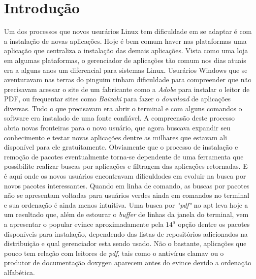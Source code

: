 \chapter{Introdução}
\label{cha:introducao}



Um dos processos  que novos usurários Linux tem dificuldade em se adaptar é com a instalação de novas aplicações. Hoje é bem comum haver nas plataformas uma aplicação que centraliza a instalação das demais aplicações. Vista como uma loja em algumas plataformas, o gerenciador de aplicações tão comum nos dias atuais era a alguns anos um diferencial para sistemas Linux. Usurários Windows que se aventuravam nas terras do pinguim  tinham dificuldade para compreender que não precisavam acessar o site de um fabricante como a \textit{Adobe} para instalar o leitor de PDF, ou frequentar sites como \textit{Baixaki} para fazer o \textit{download} de aplicações diversas. Tudo o que precisavam era abrir o terminal e com alguns comandos o software era instalado de uma fonte confiável. A compreensão deste processo abria novas fronteiras para o novo usuário, que agora buscava expandir seu conhecimento e testar novas aplicações dentre as milhares que estavam ali disponível para ele gratuitamente. Obviamente que o processo de instalação e remoção de pacotes eventualmente torna-se dependente de uma ferramenta que possibilite realizar buscas por aplicações e filtragem das aplicações retornadas. E é aqui onde os novos usuários encontravam dificuldades em evoluir na busca por novos pacotes interessantes. Quando em linha de comando, as buscas por pacotes não se apresentam voltadas para usuários verdes ainda em comandos no terminal e sua ordenação é ainda menos intuitiva. Uma busca por \textit{"pdf"} no {\code apt} leva hoje a um resultado que, além de estourar o \textit{buffer} de linhas da janela do terminal, vem a apresentar o popular {\code evince} aproximadamente pela $14^a$ opção dentre os  pacotes disponíveis para instalação, dependendo das listas de repositórios adicionados na distribuição e qual gerenciador esta sendo usado.
Não o bastante, aplicações que pouco tem relação com leitores de \textit{pdf}, tais como o antivírus {\code clamav} ou o produtor de documentação {\code doxygen} aparecem antes do {\code evince} devido a ordenação alfabética.

